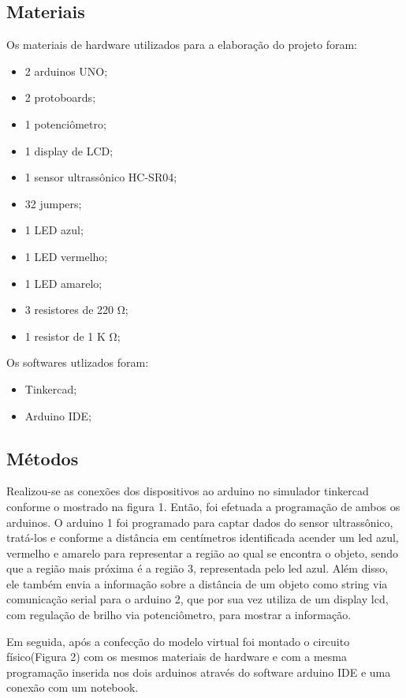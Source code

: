 \documentclass[conference]{IEEEtran}
\begin{document}
\subsection{Materiais}
Os materiais de hardware utilizados para a elaboração do projeto foram:
\begin{itemize}
    \item 2 arduinos UNO;
    \item 2 protoboards;
    \item 1 potenciômetro;
    \item 1 display de LCD;
    \item 1 sensor ultrassônico HC-SR04;
    \item 32 jumpers;
    \item 1 LED azul;
    \item 1 LED vermelho;
    \item 1 LED amarelo;
    \item 3 resistores de 220 \si{\ohm};
    \item 1 resistor de 1 K \si{\ohm};
\end{itemize}
Os softwares utlizados foram:
\begin{itemize}
    \item Tinkercad;
    \item Arduino IDE;
\end{itemize}

\subsection{Métodos}

Realizou-se as conexões dos dispositivos ao arduino no simulador tinkercad conforme o mostrado na figura 1.
Então, foi efetuada a programação de ambos os arduinos. O arduino 1 foi programado para captar dados do sensor ultrassônico, tratá-los
e conforme a distância em centímetros identificada acender um led azul, vermelho e amarelo para representar a região ao qual se encontra o objeto, sendo que a região mais próxima é a região 3, representada pelo led azul.
Além disso, ele também envia a informação sobre a distância de um objeto como string via comunicação serial para o arduino 2, que por sua vez utiliza de um display lcd, com regulação de brilho via potenciômetro, para mostrar a informação.

Em seguida, após a confecção do modelo virtual foi montado o circuito físico(Figura 2) com os mesmos materiais de hardware e com a mesma programação inserida nos dois arduinos através do software arduino IDE e uma conexão com um notebook.
\end{document}
